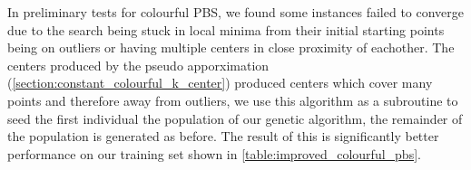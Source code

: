 In preliminary tests for colourful PBS, we found some instances failed to converge due to the search being stuck in local minima from their initial starting points being on outliers or having multiple centers in close proximity of eachother. The centers produced by the pseudo apporximation (\cref{section:constant_colourful_k_center}) produced centers which cover many points and therefore away from outliers, we use this algorithm as a subroutine to seed the first individual the population of our genetic algorithm, the remainder of the population is generated as before. The result of this is significantly better performance on our training set shown in \cref{table:improved_colourful_pbs}.

